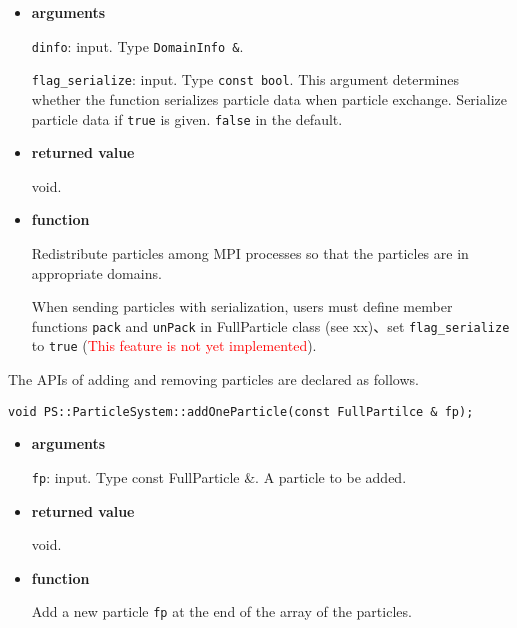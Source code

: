 \begin{itemize}

\item {\bf arguments}

{\tt dinfo}: input. Type {\tt DomainInfo \&}.

\texttt{flag\_serialize}: input. Type \texttt{const bool}. This argument determines whether the function serializes particle data when particle exchange. Serialize particle data if \texttt{true} is given. \texttt{false} in the default.

\item {\bf returned value}

void.

\item {\bf function}

Redistribute particles among MPI processes so that the particles are in appropriate domains.

When sending particles with serialization, users must define member functions \texttt{pack} and \texttt{unPack} in FullParticle class (see xx)、set \texttt{flag\_serialize} to \texttt{true} (\textcolor{red}{This feature is not yet implemented}).



\end{itemize}


\label{sec:addAndRemoveParticle}

The APIs of adding and removing particles are declared as follows.

\begin{screen}
\begin{verbatim}
void PS::ParticleSystem::addOneParticle(const FullPartilce & fp);
\end{verbatim}
\end{screen}

\begin{itemize}

\item {\bf arguments}

{\tt fp}: input. Type const FullParticle \&. A particle to be added.

\item {\bf returned value}

void.

\item {\bf function}

Add a new particle {\tt fp} at the end of the array of the particles.

\end{itemize}


